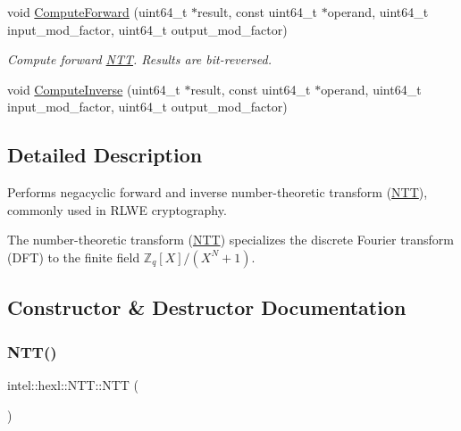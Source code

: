 \begin{DoxyCompactItemize}
\item 
void \hyperlink{classintel_1_1hexl_1_1NTT_a7f8dac5ff3fc117d3e7259762a716140}{Compute\+Forward} (uint64\+\_\+t $\ast$result, const uint64\+\_\+t $\ast$operand, uint64\+\_\+t input\+\_\+mod\+\_\+factor, uint64\+\_\+t output\+\_\+mod\+\_\+factor)
\begin{DoxyCompactList}\small\item\em Compute forward \hyperlink{classintel_1_1hexl_1_1NTT}{N\+TT}. Results are bit-\/reversed. \end{DoxyCompactList}\item 
void \hyperlink{classintel_1_1hexl_1_1NTT_a31e78375dcafd5df85cb1259a9156a9a}{Compute\+Inverse} (uint64\+\_\+t $\ast$result, const uint64\+\_\+t $\ast$operand, uint64\+\_\+t input\+\_\+mod\+\_\+factor, uint64\+\_\+t output\+\_\+mod\+\_\+factor)
\end{DoxyCompactItemize}


\subsection{Detailed Description}
Performs negacyclic forward and inverse number-\/theoretic transform (\hyperlink{classintel_1_1hexl_1_1NTT}{N\+TT}), commonly used in R\+L\+WE cryptography. 

The number-\/theoretic transform (\hyperlink{classintel_1_1hexl_1_1NTT}{N\+TT}) specializes the discrete Fourier transform (D\+FT) to the finite field $ \mathbb{Z}_q[X] / (X^N + 1) $. 

\subsection{Constructor \& Destructor Documentation}
\mbox{\label{classintel_1_1hexl_1_1NTT_ade0447617b50232d2a076f99e672d15c}} 
\subsubsection{\texorpdfstring{N\+T\+T()}{NTT()}\hspace{0.1cm}{\footnotesize\ttfamily [1/5]}}
{\footnotesize\ttfamily intel\+::hexl\+::\+N\+T\+T\+::\+N\+TT (\begin{DoxyParamCaption}{ }\end{DoxyParamCaption})}




